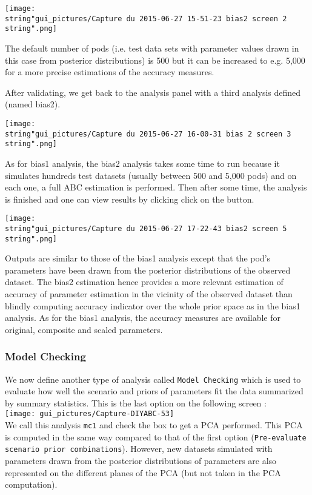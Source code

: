 \texttt{[image: \\string"gui\_pictures/Capture du 2015-06-27 15-51-23 bias2 screen 2\\string".png]}

The default number of pods (i.e. test data sets with parameter values
drawn in this case from posterior distributions) is 500 but it can
be increased to e.g. 5,000 for a more precise estimations of the accuracy
measures.

After validating, we get back to the analysis panel with a third analysis
defined (named bias2).

\texttt{[image: \\string"gui\_pictures/Capture du 2015-06-27 16-00-31 bias 2 screen 3\\string".png]}

As for bias1 analysis, the bias2 analysis takes some time to run because
it simulates hundreds test datasets (usually between 500 and 5,000
pods) and on each one, a full ABC estimation is performed. Then after
some time, the analysis is finished and one can view results by clicking
click on the  button.

\texttt{[image: \\string"gui\_pictures/Capture du 2015-06-27 17-22-43 bias2 screen 5\\string".png]}

Outputs are similar to those of the bias1 analysis except that the
pod's parameters have been drawn from the posterior distributions
of the observed dataset. The bias2 estimation hence provides a more
relevant estimation of accuracy of parameter estimation in the vicinity
of the observed dataset than blindly computing accuracy indicator
over the whole prior space as in the bias1 analysis. As for the bias1
analysis, the accuracy measures are available for original, composite
and scaled parameters.


\subsubsection{Model Checking}

We now define another type of analysis called \texttt{Model Checking}
which is used to evaluate how well the scenario and priors of parameters
fit the data summarized by summary statistics. This is the last option
on the following screen :\\


\texttt{[image: gui\_pictures/Capture-DIYABC-53]} \\


We call this analysis \texttt{mc1} and check the box to get a PCA
performed. This PCA is computed in the same way compared to that of
the first option (\texttt{Pre-evaluate scenario prior combinations}).
However, new datasets simulated with parameters drawn from the posterior
distributions of parameters are also represented on the different
planes of the PCA (but not taken in the PCA computation).

